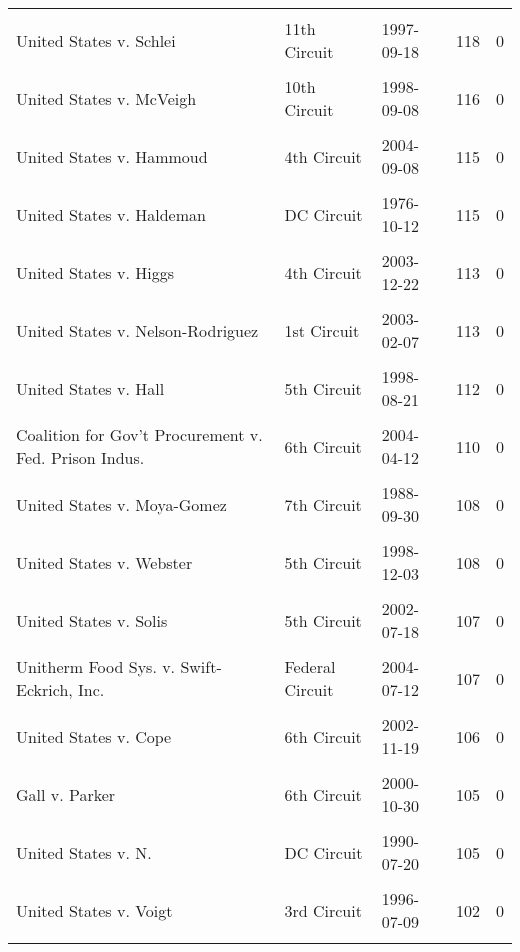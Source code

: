 \documentclass[10pt, letterpaper]{article}
\begin{document}
\begin{spacing}{1.0}
\begin{footnotesize}
\begin{longtable}[H]{p{3.5in}llrr}
& & & &\\[-6pt]
United States v. Schlei & 11th Circuit & 1997-09-18 & 118 & 0\\
& & & &\\[-6pt]
United States v. McVeigh & 10th Circuit & 1998-09-08 & 116 & 0\\
& & & &\\[-6pt]
United States v. Hammoud & 4th Circuit & 2004-09-08 & 115 & 0\\
& & & &\\[-6pt]
United States v. Haldeman & DC Circuit & 1976-10-12 & 115 & 0\\
& & & &\\[-6pt]
United States v. Higgs & 4th Circuit & 2003-12-22 & 113 & 0\\
& & & &\\[-6pt]
United States v. Nelson-Rodriguez & 1st Circuit & 2003-02-07 & 113 & 0\\
& & & &\\[-6pt]
United States v. Hall & 5th Circuit & 1998-08-21 & 112 & 0\\
& & & &\\[-6pt]
Coalition for Gov't Procurement v. Fed. Prison Indus. & 6th Circuit & 2004-04-12 & 110 & 0\\
& & & &\\[-6pt]
United States v. Moya-Gomez & 7th Circuit & 1988-09-30 & 108 & 0\\
& & & &\\[-6pt]
United States v. Webster & 5th Circuit & 1998-12-03 & 108 & 0\\
& & & &\\[-6pt]
United States v. Solis & 5th Circuit & 2002-07-18 & 107 & 0\\
& & & &\\[-6pt]
Unitherm Food Sys. v. Swift-Eckrich, Inc. & Federal Circuit & 2004-07-12 & 107 & 0\\
& & & &\\[-6pt]
United States v. Cope & 6th Circuit & 2002-11-19 & 106 & 0\\
& & & &\\[-6pt]
Gall v. Parker & 6th Circuit & 2000-10-30 & 105 & 0\\
& & & &\\[-6pt]
United States v. N. & DC Circuit & 1990-07-20 & 105 & 0\\
& & & &\\[-6pt]
United States v. Voigt & 3rd Circuit & 1996-07-09 & 102 & 0\\
& & & &\\[-6pt]

\end{longtable}
\end{footnotesize}
\end{spacing}
\end{document}
